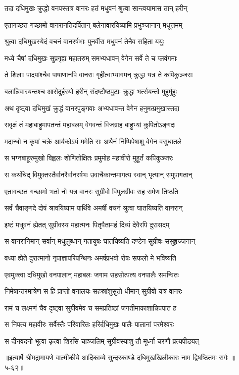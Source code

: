 \twolineshloka
{तदा दधिमुखः क्रुद्धो वनपस्तत्र वानरः}
{हतं मधुवनं श्रुत्वा सान्त्वयामास तान् हरीन्} %

\twolineshloka
{एतागच्छत गच्छामो वानरानतिदर्पितान्}
{बलेनावारयिष्यामि प्रभुञ्जानान् मधूत्तमम्} %

\twolineshloka
{श्रुत्वा दधिमुखस्येदं वचनं वानरर्षभाः}
{पुनर्वीरा मधुवनं तेनैव सहिता ययुः} %

\twolineshloka
{मध्ये चैषां दधिमुखः सुप्रगृह्य महातरुम्}
{समभ्यधावन् वेगेन सर्वे ते च प्लवंगमाः} %

\twolineshloka
{ते शिलाः पादपांश्चैव पाषाणानपि वानराः}
{गृहीत्वाभ्यागमन् क्रुद्धा यत्र ते कपिकुञ्जराः} %

\twolineshloka
{बलान्निवारयन्तश्च आसेदुर्हरयो हरीन्}
{संदष्टौष्ठपुटाः क्रुद्धा भर्त्सयन्तो मुहुर्मुहुः} %

\twolineshloka
{अथ दृष्ट्वा दधिमुखं क्रुद्धं वानरपुङ्गवाः}
{अभ्यधावन्त वेगेन हनुमत्प्रमुखास्तदा} %

\twolineshloka
{सवृक्षं तं महाबाहुमापतन्तं महाबलम्}
{वेगवन्तं विजग्राह बाहुभ्यां कुपितोऽङ्गदः} %

\twolineshloka
{मदान्धो न कृपां चक्रे आर्यकोऽयं ममेति सः}
{अथैनं निष्पिपेषाशु वेगेन वसुधातले} %

\twolineshloka
{स भग्नबाहूरुमुखो विह्वलः शोणितोक्षितः}
{प्रमुमोह महावीरो मुहूर्तं कपिकुञ्जरः} %

\twolineshloka
{स कथंचिद् विमुक्तस्तैर्वानरैर्वानरर्षभः}
{उवाचैकान्तमागत्य स्वान् भृत्यान् समुपागतान्} %

\twolineshloka
{एतागच्छत गच्छामो भर्ता नो यत्र वानरः}
{सुग्रीवो विपुलग्रीवः सह रामेण तिष्ठति} %

\twolineshloka
{सर्वं चैवाङ्गदे दोषं श्रावयिष्याम पार्थिवे}
{अमर्षी वचनं श्रुत्वा घातयिष्यति वानरान्} %

\twolineshloka
{इष्टं मधुवनं ह्येतत् सुग्रीवस्य महात्मनः}
{पितृपैतामहं दिव्यं देवैरपि दुरासदम्} %

\twolineshloka
{स वानरानिमान् सर्वान् मधुलुब्धान् गतायुषः}
{घातयिष्यति दण्डेन सुग्रीवः ससुहृज्जनान्} %

\twolineshloka
{वध्या ह्येते दुरात्मानो नृपाज्ञापरिपन्थिनः}
{अमर्षप्रभवो रोषः सफलो मे भविष्यति} %

\twolineshloka
{एवमुक्त्वा दधिमुखो वनपालान् महाबलः}
{जगाम सहसोत्पत्य वनपालैः समन्वितः} %

\twolineshloka
{निमेषान्तरमात्रेण स हि प्राप्तो वनालयः}
{सहस्रांशुसुतो धीमान् सुग्रीवो यत्र वानरः} %

\twolineshloka
{रामं च लक्ष्मणं चैव दृष्ट्वा सुग्रीवमेव च}
{समप्रतिष्ठां जगतीमाकाशान्निपपात ह} %

\twolineshloka
{स निपत्य महावीरः सर्वैस्तैः परिवारितः}
{हरिर्दधिमुखः पालैः पालानां परमेश्वरः} %

\twolineshloka
{स दीनवदनो भूत्वा कृत्वा शिरसि चाञ्जलिम्}
{सुग्रीवस्याशु तौ मूर्ध्ना चरणौ प्रत्यपीडयत्} %


॥इत्यार्षे श्रीमद्रामायणे वाल्मीकीये आदिकाव्ये सुन्दरकाण्डे दधिमुखखिलीकारः नाम द्विषष्ठितमः सर्गः ॥५-६२॥

